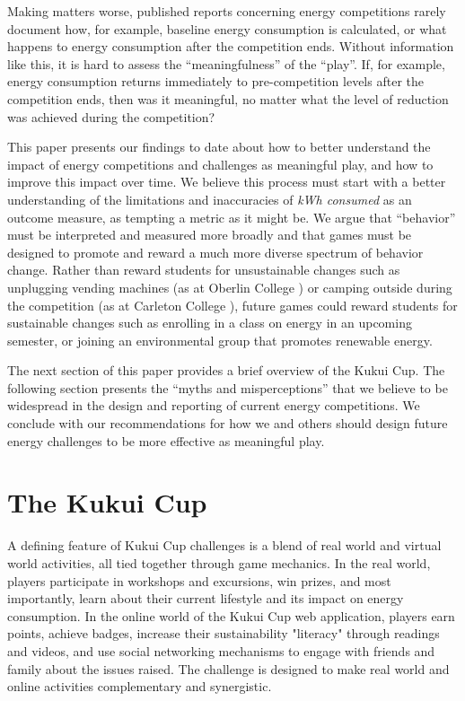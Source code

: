 \documentclass[jou]{apa} %
\begin{document}
Making matters worse, published reports concerning energy competitions rarely document
how, for example, baseline energy consumption is calculated, or what happens to energy
consumption after the competition ends.  Without information like this, it is hard to
assess the ``meaningfulness'' of the ``play''.  If, for example, energy consumption
returns immediately to pre-competition levels after the competition ends, then was it 
meaningful, no matter what the level of reduction was achieved during the competition?

This paper presents our findings to date about how to better understand the impact of
energy competitions and challenges as meaningful play, and how to improve this impact over
time.  We believe this process must start with a better understanding of the limitations
and inaccuracies of {\em kWh consumed} as an outcome measure, as tempting a metric as it
might be.  We argue that ``behavior'' must be interpreted and measured more broadly and
that games must be designed to promote and reward a much more diverse spectrum of behavior
change.  Rather than reward students for unsustainable changes such as unplugging vending
machines (as at Oberlin College \cite{Petersen07a}) or camping outside during the
competition (as at Carleton College \cite{Hodge2010}), future games could reward students
for sustainable changes such as enrolling in a class on energy in an upcoming semester, or
joining an environmental group that promotes renewable energy.  

The next section of this paper provides a brief overview of the Kukui Cup.   The following
section presents the ``myths and misperceptions'' that we believe to be widespread in the
design and reporting of current energy competitions. We conclude with our recommendations
for how we and others should design future energy challenges to be more effective as
meaningful play.

\section{The Kukui Cup}

A defining feature of Kukui Cup challenges is a blend of real world and virtual world
activities, all tied together through game mechanics.  In the real world, players
participate in workshops and excursions, win 
prizes, and most importantly, learn about their current lifestyle and its impact on
energy consumption.  In the online world of the Kukui Cup web application, players
earn points, achieve badges, increase their sustainability "literacy" through readings and
videos, and use social networking mechanisms to engage with friends and family about the
issues raised. The challenge is designed to make real world and online activities
complementary and synergistic.
\end{document}
